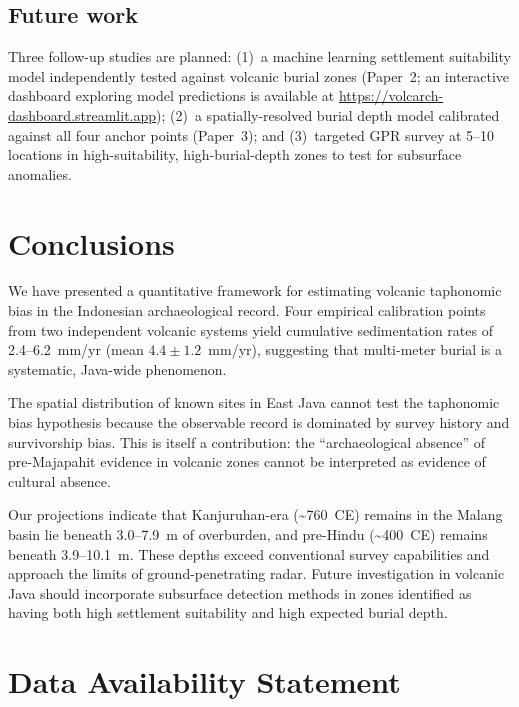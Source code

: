 \documentclass[12pt,a4paper]{article}
\begin{document}
\subsection{Future work}

Three follow-up studies are planned: (1)~a machine learning settlement suitability model independently tested against volcanic burial zones (Paper~2; an interactive dashboard exploring model predictions is available at \url{https://volcarch-dashboard.streamlit.app}); (2)~a spatially-resolved burial depth model calibrated against all four anchor points (Paper~3); and (3)~targeted GPR survey at 5--10 locations in high-suitability, high-burial-depth zones to test for subsurface anomalies.

\section{Conclusions}

We have presented a quantitative framework for estimating volcanic taphonomic bias in the Indonesian archaeological record. Four empirical calibration points from two independent volcanic systems yield cumulative sedimentation rates of 2.4--6.2~mm/yr (mean $4.4 \pm 1.2$~mm/yr), suggesting that multi-meter burial is a systematic, Java-wide phenomenon.

The spatial distribution of known sites in East Java cannot test the taphonomic bias hypothesis because the observable record is dominated by survey history and survivorship bias. This is itself a contribution: the ``archaeological absence'' of pre-Majapahit evidence in volcanic zones cannot be interpreted as evidence of cultural absence.

Our projections indicate that Kanjuruhan-era (\textasciitilde760~CE) remains in the Malang basin lie beneath 3.0--7.9~m of overburden, and pre-Hindu (\textasciitilde400~CE) remains beneath 3.9--10.1~m. These depths exceed conventional survey capabilities and approach the limits of ground-penetrating radar. Future investigation in volcanic Java should incorporate subsurface detection methods in zones identified as having both high settlement suitability and high expected burial depth.

\section*{Data Availability Statement}
\end{document}
